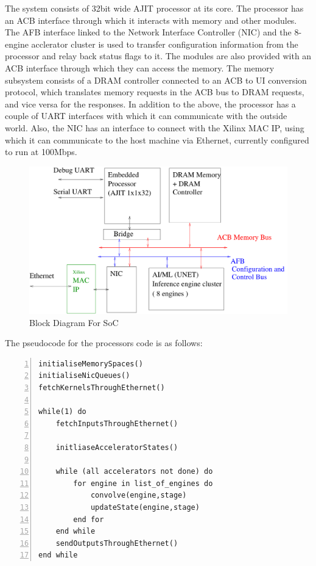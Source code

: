 \documentclass[a4paper,12pt, final]{report}
\begin{document}
The system consists of 32bit wide AJIT processor at its core. The processor has an ACB interface through which it interacts with memory and other modules. The AFB interface linked to the Network Interface Controller (NIC) and the 8-engine acclerator cluster is used to transfer configuration information from the processor and relay back status flags to it. The modules are also provided with an ACB interface through which they can access the memory. The memory subsystem consists of a DRAM controller connected to an ACB to UI conversion protocol, which translates memory requests in the ACB bus to DRAM requests, and vice versa for the responses. In addition to the above, the processor has a couple of UART interfaces with which it can communicate with the outside world. Also, the NIC has an interface to connect with the Xilinx MAC IP, using which it can communicate to the host machine via Ethernet, currently configured to run at 100Mbps. 
\\
\begin{figure}[h!]
    \centering
    \includegraphics[width=\textwidth]{BlockDiagram.pdf}
	\caption{Block Diagram For SoC}
    \label{fig:SOC}
\end{figure}

The pseudocode for the processors code is as follows:

\begin{Verbatim}[numbers=left]
initialiseMemorySpaces()
initialiseNicQueues()
fetchKernelsThroughEthernet()

while(1) do
	fetchInputsThroughEthernet()
	
	initliaseAcceleratorStates()
	
	while (all accelerators not done) do
		for engine in list_of_engines do
			convolve(engine,stage)
			updateState(engine,stage)
		end for
	end while
	sendOutputsThroughEthernet()
end while
\end{Verbatim}
\end{document}
